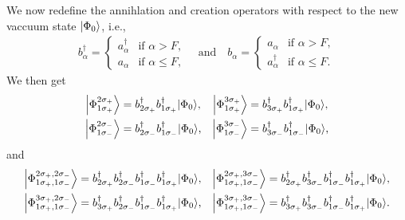 We now redefine the annihlation and creation operators with respect to the new vaccuum state $\ket*{\Phi_0}$, i.e.,
\begin{align*}
    b^\dagger_\alpha =
    \begin{cases}
        a^\dagger_\alpha & \text{if } \alpha > F, \\
        a_\alpha & \text{if } \alpha \leq F,
    \end{cases}
    \quad \text{and} \quad
    b_\alpha =
    \begin{cases}
        a_\alpha & \text{if } \alpha > F, \\
        a^\dagger_\alpha & \text{if } \alpha \leq F.
    \end{cases}
\end{align*}
We then get
\begin{align*}\label{eq:1p1h}
    \ket*{\Phi_{1\sigma_{+}}^{2\sigma_{+}}} &= b_{2\sigma_{+}}^\dagger b_{1\sigma_{+}}^\dagger \ket*{\Phi_0}, &
    \ket*{\Phi_{1\sigma_{+}}^{3\sigma_{+}}} &= b_{3\sigma_{+}}^\dagger b_{1\sigma_{+}}^\dagger \ket*{\Phi_0}, \\
    \ket*{\Phi_{1\sigma_{-}}^{2\sigma_{-}}} &= b_{2\sigma_{-}}^\dagger b_{1\sigma_{-}}^\dagger \ket*{\Phi_0}, &
    \ket*{\Phi_{1\sigma_{-}}^{3\sigma_{-}}} &= b_{3\sigma_{-}}^\dagger b_{1\sigma_{-}}^\dagger \ket*{\Phi_0},
\end{align*}
and
\begin{align*}
    \ket*{\Phi_{1\sigma_{+}, 1\sigma_{-}}^{2\sigma_{+}, 2\sigma_{-}}} &= b_{2\sigma_{+}}^\dagger b_{2\sigma_{-}}^\dagger b_{1\sigma_{-}}^\dagger b_{1\sigma_{+}}^\dagger \ket*{\Phi_0}, &
    \ket*{\Phi_{1\sigma_{+}, 1\sigma_{-}}^{2\sigma_{+}, 3\sigma_{-}}} &= b_{2\sigma_{+}}^\dagger b_{3\sigma_{-}}^\dagger b_{1\sigma_{-}}^\dagger b_{1\sigma_{+}}^\dagger \ket*{\Phi_0}, \\
    \ket*{\Phi_{1\sigma_{+}, 1\sigma_{-}}^{3\sigma_{+}, 2\sigma_{-}}} &= b_{3\sigma_{+}}^\dagger b_{2\sigma_{-}}^\dagger b_{1\sigma_{-}}^\dagger b_{1\sigma_{+}}^\dagger \ket*{\Phi_0}, &
    \ket*{\Phi_{1\sigma_{+}, 1\sigma_{-}}^{3\sigma_{+}, 3\sigma_{-}}} &= b_{3\sigma_{+}}^\dagger b_{3\sigma_{-}}^\dagger b_{1\sigma_{-}}^\dagger b_{1\sigma_{+}}^\dagger \ket*{\Phi_0}.
\end{align*}

